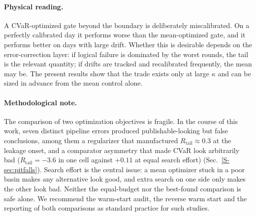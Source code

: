 \documentclass[aps,pra,twocolumn,superscriptaddress,reprint,nofootinbib,floatfix]{revtex4-2}
\theoremstyle{definition}
\newcommand{\Rt}{R_{\mathrm{tail}}}
\newcommand{\sref}[1]{Sec.~\ref{S-#1}}
\begin{document}
\paragraph*{Physical reading.} A CVaR-optimized gate beyond the boundary is
deliberately miscalibrated. On a perfectly calibrated day it performs worse
than the mean-optimized gate, and it performs better on days with large
drift. Whether this is desirable depends on the error-correction layer: if
logical failure is dominated by the worst rounds, the tail is the relevant
quantity; if drifts are tracked and recalibrated frequently, the mean may be.
The present results show that the trade exists only at large $\kappa$ and can
be sized in advance from the mean control alone.

\paragraph*{Methodological note.} The comparison of two optimization
objectives is fragile. In the course of this work, seven distinct pipeline
errors produced publishable-looking but false conclusions, among them a
regularizer that manufactured $\Rt\approx0.3$ at the leakage onset, and a
comparator asymmetry that made CVaR look arbitrarily bad ($\Rt=-3.6$ in one
cell against $+0.11$ at equal search effort) (\sref{sec:pitfalls}). Search
effort is the central issue: a mean optimizer stuck in a poor basin makes any
alternative look good, and extra search on one side only makes the other look
bad. Neither the equal-budget nor the best-found comparison is safe alone. We
recommend the warm-start audit, the reverse warm start and the reporting of
both comparisons as standard practice for such studies.
\end{document}
